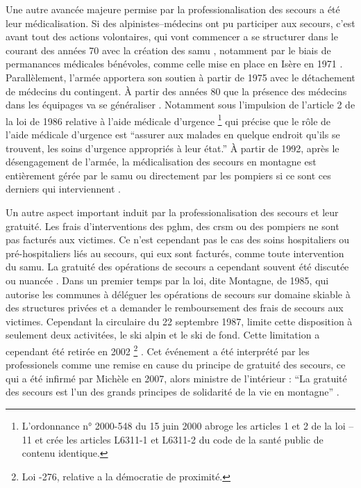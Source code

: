 Une autre avancée majeure permise par la professionalisation des
secours a été leur médicalisation. Si des alpinistes--médecins ont pu
participer aux secours, c'est avant tout des actions volontaires, qui
vont commencer a se structurer dans le courant des années 70 avec la
création des \ac{samu} \autocite{Halle2007}, notamment par le biais de
permanances médicales bénévoles, comme celle mise en place en Isère en
1971 \autocite{Rocourt2014}. Parallèlement, l'armée apportera son
soutien à partir de 1975 avec le détachement de médecins du
contingent. À partir des années 80 que la présence des médecins dans
les équipages va se généraliser \autocite{CFDLD}. Notamment sous
l'impulsion de l'article 2 de la loi de 1986 relative à l'aide
médicale d'urgence \footnote{L’ordonnance n° 2000-548 du 15 juin 2000
  abroge les articles 1 et 2 de la loi --11 et crée les articles
  L6311-1 et L6311-2 du code de la santé public de contenu identique.}
\autocite{Rocourt2014} qui précise que le rôle de l'aide médicale
d'urgence est \enquote{assurer aux malades \textelp{} en
  quelque endroit qu'ils se trouvent, les soins d'urgence appropriés à
  leur état.} À partir de 1992, après le désengagement de l'armée, la
médicalisation des secours en montagne est entièrement gérée par le
\ac{samu} ou directement par les pompiers si ce sont ces derniers qui
interviennent \autocite{Rocourt2014, Halle2007}.

Un autre aspect important induit par la professionalisation des
secours et leur gratuité. Les frais d'interventions des \ac{pghm}, des
\ac{crsm} ou des pompiers ne sont pas facturés aux victimes. Ce n'est
cependant pas le cas des soins hospitaliers ou pré-hospitaliers liés
au secours, qui eux sont facturés, comme toute intervention du
\ac{samu}. La gratuité des opérations de secours a cependant souvent
été discutée ou nuancée \autocite{CFDLD, Halle2007, Magne2017}. Dans
un premier temps par la loi, dite Montagne, de 1985, qui autorise les
communes à déléguer les opérations de secours sur domaine skiable à
des structures privées et a demander le remboursement des frais de
secours aux victimes. Cependant la circulaire du 22 septembre 1987,
limite cette disposition à seulement deux activitées, le ski alpin et
le ski de fond. Cette limitation a cependant été retirée en 2002
\footnote{Loi -276, relative a la démocratie de proximité.}
\autocite{Magne2017}. Cet événement a été interprété par les
professionels comme une remise en cause du principe de gratuité des
secours, ce qui a été infirmé par Michèle  en 2007,
alors ministre de l'intérieur : \enquote{La gratuité des secours est
  l’un des grands principes de solidarité de la vie en montagne}
\autocite{Descamps2018}.

